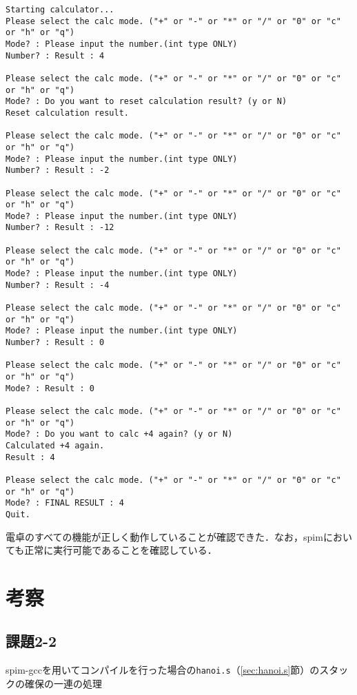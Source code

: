 \begin{Verbatim}[fontsize=\small, baselinestretch=0.8]
Starting calculator...
Please select the calc mode. ("+" or "-" or "*" or "/" or "0" or "c" or "h" or "q")
Mode? : Please input the number.(int type ONLY)
Number? : Result : 4

Please select the calc mode. ("+" or "-" or "*" or "/" or "0" or "c" or "h" or "q")
Mode? : Do you want to reset calculation result? (y or N)
Reset calculation result.

Please select the calc mode. ("+" or "-" or "*" or "/" or "0" or "c" or "h" or "q")
Mode? : Please input the number.(int type ONLY)
Number? : Result : -2

Please select the calc mode. ("+" or "-" or "*" or "/" or "0" or "c" or "h" or "q")
Mode? : Please input the number.(int type ONLY)
Number? : Result : -12

Please select the calc mode. ("+" or "-" or "*" or "/" or "0" or "c" or "h" or "q")
Mode? : Please input the number.(int type ONLY)
Number? : Result : -4

Please select the calc mode. ("+" or "-" or "*" or "/" or "0" or "c" or "h" or "q")
Mode? : Please input the number.(int type ONLY)
Number? : Result : 0

Please select the calc mode. ("+" or "-" or "*" or "/" or "0" or "c" or "h" or "q")
Mode? : Result : 0

Please select the calc mode. ("+" or "-" or "*" or "/" or "0" or "c" or "h" or "q")
Mode? : Do you want to calc +4 again? (y or N)
Calculated +4 again.
Result : 4

Please select the calc mode. ("+" or "-" or "*" or "/" or "0" or "c" or "h" or "q")
Mode? : FINAL RESULT : 4
Quit.
\end{Verbatim}

電卓のすべての機能が正しく動作していることが確認できた．なお，spimにおいても正常に実行可能であることを確認している．

\section{考察} \label{sec:review}

\subsection{課題2-2}
spim-gccを用いてコンパイルを行った場合の\verb|hanoi.s|（\ref{sec:hanoi.s}節）のスタックの確保の一連の処理

